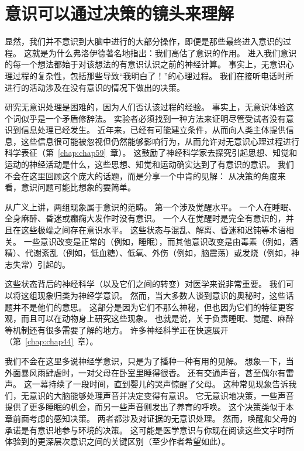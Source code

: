 \section{意识可以通过决策的镜头来理解}

显然，我们并不意识到大脑中进行的大部分操作，即便是那些最终进入意识的过程。
这就是为什么弗洛伊德著名地指出：我们高估了意识的作用。
进入我们意识的每一个想法都始于对该想法的有意识认识之前的神经计算。
事实上，无意识心理过程的复杂性，包括那些导致“我明白了！”的心理过程。
我们在接听电话时所进行的活动涉及在没有意识的情况下做出的决策。


研究无意识处理是困难的，因为人们否认该过程的经验。
事实上，无意识体验这个词似乎是一个矛盾修辞法。
实验者必须找到一种方法来证明尽管受试者没有意识到信息处理已经发生。
近年来，已经有可能建立条件，从而向人类主体提供信息，这些信息很可能被忽视但仍然能够影响行为，从而允许对无意识心理过程进行科学表征（第~\ref{chap:chap59}~章）。
这鼓励了神经科学家去探究引起思想、知觉和运动的神经活动是什么，这些思想、知觉和运动确实达到了有意识的意识。
我们不会在这里回顾这个庞大的话题，而是分享一个中肯的见解：
从决策的角度来看，意识问题可能比想象的要简单。


从广义上讲，两组现象属于意识的范畴。
第一个涉及觉醒水平。
一个人在睡眠、全身麻醉、昏迷或癫痫大发作时没有意识。
一个人在觉醒时是完全有意识的，并且在这些极端之间存在意识水平。
这些状态与混乱、解离、昏迷和迟钝等术语相关。
一些意识改变是正常的（例如，睡眠），而其他意识改变是由毒素（例如，酒精）、代谢紊乱（例如，低血糖）、低氧、外伤（例如，脑震荡）或发烧（例如，神志失常）引起的。


这些状态背后的神经科学（以及它们之间的转变）对医学来说非常重要。
我们可以将这组现象归类为神经学意识。
然而，当大多数人谈到意识的奥秘时，这些话题并不是他们的意思。
这部分是因为它们不那么神秘，但也因为它们的特征更客观，而且可以在动物身上研究这些现象。
也就是说，关于负责睡眠、觉醒、麻醉等机制还有很多需要了解的地方。
许多神经科学正在快速展开（第~\ref{chap:chap44}~章）。


我们不会在这里多说神经学意识，只是为了播种一种有用的见解。
想象一下，当外面暴风雨肆虐时，一对父母在卧室里睡得很香。
还有交通声音，甚至偶尔有雷声。
这一幕持续了一段时间，直到婴儿的哭声惊醒了父母。
这种常见现象告诉我们，无意识的大脑能够处理声音并决定变得有意识。
它无意识地决策，一些声音提供了更多睡眠的机会，而另一些声音则发出了养育的呼唤。
这个决策类似于本章前面考虑的感知决策。
两者都涉及对证据的无意识处理。
然而，唤醒和父母的承诺是有意识地参与环境的决策。
这可能是医学意识与你现在阅读这些文字时所体验到的更深层次意识之间的关键区别（至少作者希望如此）。


